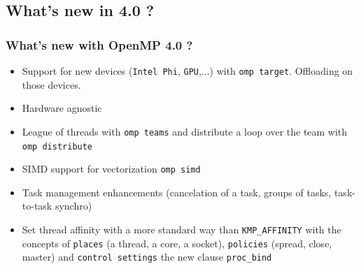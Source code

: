 
\subsection{What's new in 4.0 ?}


\begin{frame}[fragile]
  \frametitle{What's new with OpenMP 4.0 ?}

  \begin{itemize}
  \item{ Support for new devices (\verb+Intel Phi+, \verb+GPU+,...) with \verb+omp target+. Offloading on those devices. }
  \item{ Hardware agnostic}
  \item{ League of threads with \verb+omp teams+ and distribute a loop over the team with \verb+omp distribute+ }
  \item{ SIMD support for vectorization \verb+omp simd+ }
  \item{ Task management enhancements (cancelation of a task, groups of tasks, task-to-task synchro)}
  \item{ Set thread affinity with a more standard way than \verb+KMP_AFFINITY+ with the concepts of \verb+places+ (a thread, a core, a socket), \verb+policies+ (spread, close, master) and \verb+control settings+ the new clause \verb+proc_bind+}
  \end{itemize}
\end{frame}




